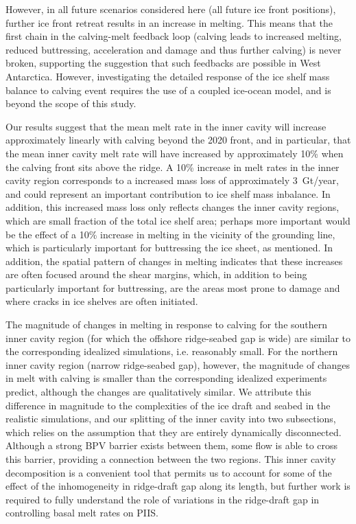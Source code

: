 \documentclass[draft]{agujournal2019}
\begin{document}
However, in all future scenarios considered here (all future ice front positions), further ice front retreat results in an increase in melting. This means that the first chain in the calving-melt feedback loop (calving leads to increased melting, reduced buttressing, acceleration and damage and thus further calving) is never broken, supporting the suggestion that such feedbacks are possible in West Antarctica. However, investigating the detailed response of the ice shelf mass balance to calving event requires the use of a coupled ice-ocean model, and is beyond the scope of this study.

Our results suggest that the mean melt rate in the inner cavity will increase approximately linearly with calving beyond the 2020 front, and in particular, that  the mean inner cavity melt rate will have increased by approximately 10\% when the calving front sits above the ridge. A 10\% increase in melt rates in the inner cavity region corresponds to a increased mass loss of approximately 3~Gt/year, and could represent an important contribution to ice shelf mass inbalance. In addition, this increased mass loss only reflects changes the inner cavity regions, which are small fraction of the total ice shelf area; perhaps more important would be the effect of a 10\% increase in melting in the vicinity of the grounding line, which is particularly important for buttressing the ice sheet, as mentioned. In addition, the spatial pattern of changes in melting indicates that these increases are often focused around the shear margins, which, in addition to being particularly important for buttressing, are the areas most prone to damage and where cracks in ice shelves are often initiated.

The magnitude of changes in melting in response to calving for the southern inner cavity region (for which the offshore ridge-seabed gap is wide) are similar to the corresponding idealized simulations, i.e. reasonably small. For the northern inner cavity region (narrow ridge-seabed gap), however, the magnitude of changes in melt with calving is smaller than the corresponding idealized experiments predict, although the changes are qualitatively similar. We attribute this difference in magnitude to the complexities of the ice draft and seabed in the realistic simulations, and our splitting of the inner cavity into two subsections, which relies on the assumption that they are entirely dynamically disconnected. Although a strong BPV barrier exists between them, some flow is able to cross this barrier, providing a connection between the two regions. This inner cavity decomposition is a convenient tool that permits us to account for some of the effect of the inhomogeneity in ridge-draft gap along its length, but further work is required to fully understand the role of variations in the ridge-draft gap in controlling basal melt rates on PIIS.
\end{document}
